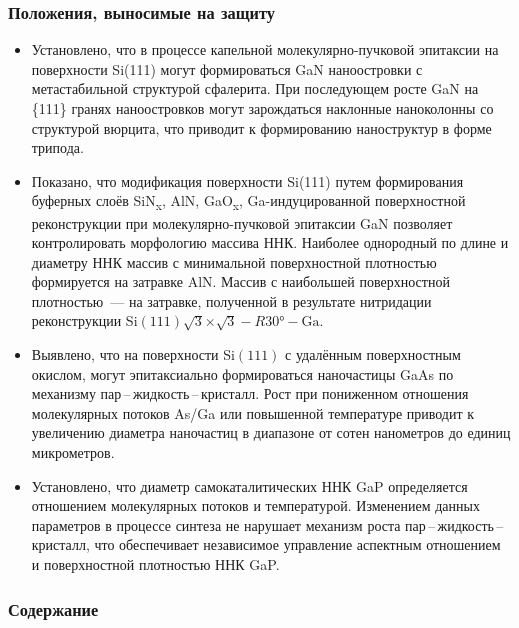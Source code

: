 \begin{frame}
    \setcounter{framenumber}{1}
    \maketitle
\end{frame}

\begin{frame}
    \frametitle{Положения, выносимые на защиту}
    \begin{itemize}
\item Установлено, что в процессе капельной молекулярно-пучковой эпитаксии на
    поверхности Si(111) могут формироваться GaN наноостровки с метастабильной
    структурой сфалерита. При последующем росте GaN
на \{111\} гранях наноостровков могут зарождаться наклонные наноколонны со
структурой вюрцита, что приводит к формированию наноструктур в форме трипода.
\item Показано, что модификация поверхности Si(111) путем
    формирования буферных слоёв SiN\textsubscript{x}, AlN,
    GaO\textsubscript{x}, Ga-индуцированной поверхностной реконструкции при
    молекулярно-пучковой эпитаксии GaN позволяет контролировать морфологию
    массива ННК. Наиболее однородный по длине и диаметру ННК массив с
    минимальной поверхностной плотностью формируется на затравке AlN. Массив с
    наибольшей поверхностной плотностью~--- на затравке, полученной в
    результате нитридации реконструкции Si\((111)\sqrt{3}\)\(\times\)\(\sqrt{3}
    - R30\si{\degree} - \text{Ga}\).
\item Выявлено, что на поверхности Si\((111)\) с удалённым поверхностным
    окислом, могут эпитаксиально формироваться наночастицы GaAs по механизму
    пар\,--\,жидкость\,--\,кристалл. Рост при пониженном отношения молекулярных
    потоков As/Ga или повышенной температуре приводит к увеличению диаметра
    наночастиц в диапазоне от сотен нанометров до единиц микрометров.
\item Установлено, что диаметр самокаталитических ННК GaP определяется
    отношением молекулярных потоков и температурой. Изменением данных
    параметров в процессе синтеза не нарушает механизм роста
    пар\,--\,жидкость\,--\,кристалл, что обеспечивает независимое управление
    аспектным отношением и поверхностной плотностью ННК GaP.
    \end{itemize}
\end{frame}

\begin{frame}
    \frametitle{Содержание}
    \tableofcontents
\end{frame}
